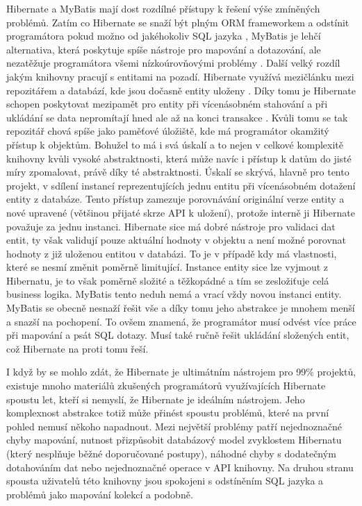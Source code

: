 \begin{itemize}
\begin{itemize}
		Hibernate a MyBatis mají dost rozdílné přístupy k řešení výše zmíněných problémů.
		Zatím co Hibernate se snaží být plným \ac{ORM} frameworkem a odstínit programátora pokud možno od jakéhokoliv
		\ac{SQL} jazyka \cite{hibernate_docs}, MyBatis je lehčí alternativa, která poskytuje spíše nástroje pro mapování a dotazování, ale
		nezatěžuje programátora všemi nízkoúrovňovými problémy \cite{mybatis_getting_started}.
		Další velký rozdíl jakým knihovny pracují s entitami na pozadí.
		Hibernate využívá mezičlánku mezi repozitářem a databází, kde jsou dočasně entity uloženy \cite{hibernate_docs}.
		Díky tomu je Hibernate schopen poskytovat mezipamět pro entity při vícenásobném stahování a při ukládání
		se data nepromítají hned ale až na konci transakce \cite{hibernate_docs}.
		Kvůli tomu se tak repozitář chová spíše jako paměťové úložiště, kde má programátor okamžitý přístup k objektům.
		Bohužel to má i svá úskalí a to nejen v celkové komplexitě knihovny kvůli vysoké abstraktnosti, která může navíc
		i přístup k datům do jisté míry zpomalovat, právě díky té abstraktnosti.
		Úskalí se skrývá, hlavně pro tento projekt, v sdílení instancí reprezentujících jednu entitu při vícenásobném
		dotažení entity z databáze.
		Tento přístup zamezuje porovnávání originální verze entity a nové upravené (většinou přijaté skrze \ac{API} k
		uložení), protože interně ji Hibernate považuje za jednu instanci.
		Hibernate sice má dobré nástroje pro validaci dat entit, ty však validují pouze aktuální hodnoty v objektu a
		není možné porovnat hodnoty z již uloženou entitou v databázi.
		To je v případě kdy má vlastnosti, které se nesmí změnit poměrně limitující.
		Instance entity sice lze vyjmout z Hibernatu, je to však poměrně složité a těžkopádné a tím se zesložiťuje
		celá business logika.
		MyBatis tento neduh nemá a vrací vždy novou instanci entity.
		MyBatis se obecně nesnaží řešit vše a díky tomu jeho abstrakce je mnohem menší a snazší na pochopení.
		To ovšem znamená, že programátor musí odvést více práce při mapování a psát \ac{SQL} dotazy.
		Musí také ručně řešit ukládání složených entit, což Hibernate na proti tomu řeší.

		I když by se mohlo zdát, že Hibernate je ultimátním nástrojem pro 99\% projektů, existuje mnoho materiálů
		zkušených programátorů využívajících Hibernate spoustu let, kteří si nemyslí, že Hibernate je ideálním nástrojem.
		Jeho komplexnost abstrakce totiž může přinést spoustu problémů, které na první pohled nemusí někoho napadnout.
		Mezi největší problémy patří nejednoznačné chyby mapování, nutnost přizpůsobit databázový model zvyklostem Hibernatu
		(který nesplňuje běžné doporučované postupy), náhodné chyby s dodatečným dotahováním dat nebo nejednoznačné operace
		v \ac{API} knihovny.
		Na druhou stranu spousta uživatelů této knihovny jsou spokojeni s odstíněním \ac{SQL} jazyka a problémů jako
		mapování kolekcí a podobně. \cite{bad_hibernate}


\end{itemize}
\end{itemize}
